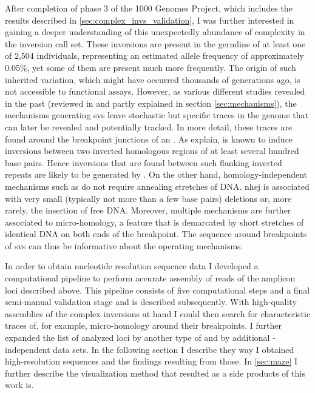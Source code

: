 After completion of phase 3 of the 1000 Genomes Project, which includes the
results described in \cref{sec:complex_invs_validation}, I was further
interested in gaining a deeper understanding of this unexpectedly abundance of
complexity in the inversion call set. These inversions are present in the
germline of at least one of 2,504 individuals, representing an estimated allele
frequency of approximately 0.05\%, yet some of them are present much more
frequently. The origin of such inherited variation, which might have occurred
thousands of generations ago, is not accessible to functional assays. However,
as various different studies revealed in the past (reviewed in
\cite{Onishi-Seebacher2011,Hastings2009} and partly explained in section
\cref{sec:mechanisms}), the mechanisms generating \acp{sv} leave stochastic but
specific traces in the genome that can later be revealed and potentially
tracked. In more detail, these traces are found around the breakpoint junctions
of an \sv. As \cite{Hastings2009} explain, \nahr is known to induce inversions
between two inverted homologous regions of at least several hundred base pairs.
Hence inversions that are found between such flanking inverted repeats are
likely to be generated by \nahr. On the other hand, homology-independent
mechanisms such as \nhej do not require annealing stretches of DNA. \acs{nhej}
is associated with very small (typically not more than a few base pairs)
deletions or, more rarely, the insertion of free DNA. Moreover, multiple
mechanisms are further associated to micro-homology, a feature that is
demarcated by short stretches of identical DNA on both ends of the breakpoint.
The sequence around breakpoints of \acp{sv} can thus be informative about the
operating mechanisms.

In order to obtain nucleotide resolution sequence data I developed a
computational pipeline to perform accurate assembly of \pacbio reads of the
amplicon loci described above. This pipeline consists of five computational
steps and a final semi-manual validation stage and is described subsequently.
With high-quality assemblies of the complex inversions at hand I could then
search for characteristic traces of, for example, micro-homology around their
breakpoints. I further expanded the list of analyzed loci by another type of \sv
and by additional \pacbio-independent data sets. In the following section I
describe they way I obtained high-resolution sequences and the findings
resulting from those. In \cref{sec:maze} I further describe the visualization
method that resulted as a side products of this work is.





